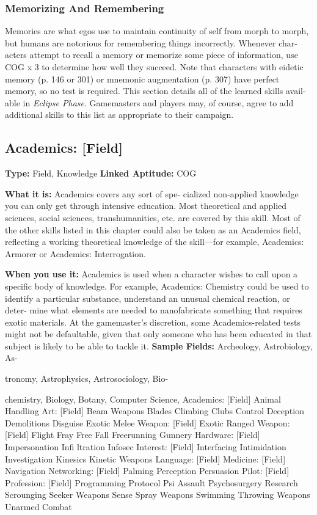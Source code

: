 \subsubsection{Memorizing And Remembering}

Memories are what egos use to maintain continuity of 
self from morph to morph, but humans are notorious 
for remembering things incorrectly. Whenever char-
acters attempt to recall a memory or memorize some 
piece of information, use COG x 3 to determine how 
well they succeed. Note that characters with eidetic 
memory (p. 146 or 301) or mnemonic augmentation 
(p. 307) have perfect memory, so no test is required.
This section details all of the learned skills avail-
able in \textit{Eclipse Phase}. Gamemasters and players 
may, of course, agree to add additional skills to 
this list as appropriate to their campaign.

\subsection{Academics: [Field]}

\textbf{Type:} Field, Knowledge
\textbf{Linked Aptitude:} COG

\textbf{What it is:} Academics covers any sort of spe-
cialized non-applied knowledge you can only get 
through intensive education. Most theoretical and 
applied sciences, social sciences, transhumanities, 
etc. are covered by this skill. Most of the other 
skills listed in this chapter could also be taken as 
an Academics field, reflecting a working theoretical 
knowledge of the skill—for example, Academics: 
Armorer or Academics: Interrogation.

\textbf{When you use it:} Academics is used when a 
character wishes to call upon a specific body of 
knowledge. For example, Academics: Chemistry 
could be used to identify a particular substance, 
understand an unusual chemical reaction, or deter-
mine what elements are needed to nanofabricate 
something that requires exotic materials. At the 
gamemaster's discretion, some Academics-related 
tests might not be defaultable, given that only 
someone who has been educated in that subject is 
likely to be able to tackle it.
\textbf{Sample Fields:} Archeology, Astrobiology, As-

tronomy, Astrophysics, Astrosociology, Bio-

chemistry, Biology, Botany, Computer Science, 
Academics: [Field]
Animal Handling
Art: [Field]
Beam Weapons
Blades
Climbing
Clubs
Control
Deception
Demolitions
Disguise
Exotic Melee Weapon: [Field]
Exotic Ranged Weapon: [Field]
Flight
Fray
Free Fall
Freerunning
Gunnery
Hardware: [Field]
Impersonation
Inﬁ ltration
Infosec
Interest: [Field]
Interfacing
Intimidation
Investigation
Kinesics
Kinetic Weapons
Language: [Field]
Medicine: [Field]
Navigation
Networking: [Field]
Palming
Perception
Persuasion
Pilot: [Field]
Profession: [Field]
Programming
Protocol
Psi Assault
Psychosurgery
Research
Scrounging
Seeker Weapons
Sense
Spray Weapons
Swimming
Throwing Weapons
Unarmed Combat


